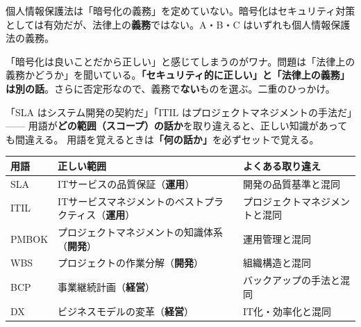 
\begin{kaisetsu}
個人情報保護法は「暗号化の義務」を定めていない。暗号化はセキュリティ対策としては有効だが、法律上の\textbf{義務}ではない。A・B・C はいずれも個人情報保護法の義務。
\end{kaisetsu}

\begin{trickwarn}
「暗号化は良いことだから正しい」と感じてしまうのがワナ。問題は「法律上の義務かどうか」を聞いている。\textbf{「セキュリティ的に正しい」と「法律上の義務」は別の話}。さらに否定形なので、義務で\textbf{ない}ものを選ぶ。二重のひっかけ。
\end{trickwarn}



\mondaipage
{}

\begin{stumble}
「SLA はシステム開発の契約だ」「ITIL はプロジェクトマネジメントの手法だ」——
用語が\textbf{どの範囲（スコープ）の話か}を取り違えると、正しい知識があっても間違える。
用語を覚えるときは\textbf{「何の話か」}を必ずセットで覚える。
\end{stumble}

\begin{comparison}
\begin{tabularx}{\textwidth}{lXX}
  \toprule
  \textbf{用語} & \textbf{正しい範囲} & \textbf{よくある取り違え} \\
  \midrule
  SLA & ITサービスの品質保証（\textbf{運用}） & 開発の品質基準と混同 \\
  ITIL & ITサービスマネジメントのベストプラクティス（\textbf{運用}） & プロジェクトマネジメントと混同 \\
  PMBOK & プロジェクトマネジメントの知識体系（\textbf{開発}） & 運用管理と混同 \\
  WBS & プロジェクトの作業分解（\textbf{開発}） & 組織構造と混同 \\
  BCP & 事業継続計画（\textbf{経営}） & バックアップの手法と混同 \\
  DX & ビジネスモデルの変革（\textbf{経営}） & IT化・効率化と混同 \\
  \bottomrule
\end{tabularx}
\end{comparison}

